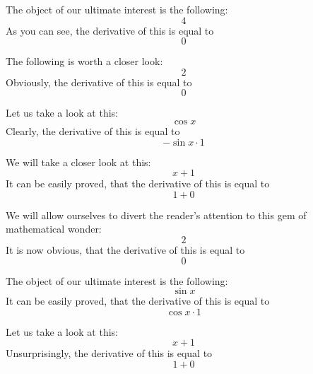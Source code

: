 \documentclass{article}
\begin{document}
The object of our ultimate interest is the following:
\begin{equation}
4 
\end{equation}
As you can see, the derivative of this is equal to
\begin{equation}
0 
\end{equation}

The following is worth a closer look:
\begin{equation}
2 
\end{equation}
Obviously, the derivative of this is equal to
\begin{equation}
0 
\end{equation}

Let us take a look at this:
\begin{equation}
\cos x 
\end{equation}
Clearly, the derivative of this is equal to
\begin{equation}
-\sin x \cdot 1 
\end{equation}

We will take a closer look at this:
\begin{equation}
x + 1 
\end{equation}
It can be easily proved, that the derivative of this is equal to
\begin{equation}
1 + 0 
\end{equation}

We will allow ourselves to divert the reader's attention to this gem of mathematical wonder:
\begin{equation}
2 
\end{equation}
It is now obvious, that the derivative of this is equal to
\begin{equation}
0 
\end{equation}

The object of our ultimate interest is the following:
\begin{equation}
\sin x 
\end{equation}
It can be easily proved, that the derivative of this is equal to
\begin{equation}
\cos x \cdot 1 
\end{equation}

Let us take a look at this:
\begin{equation}
x + 1 
\end{equation}
Unsurprisingly, the derivative of this is equal to
\begin{equation}
1 + 0 
\end{equation}
\end{document}
